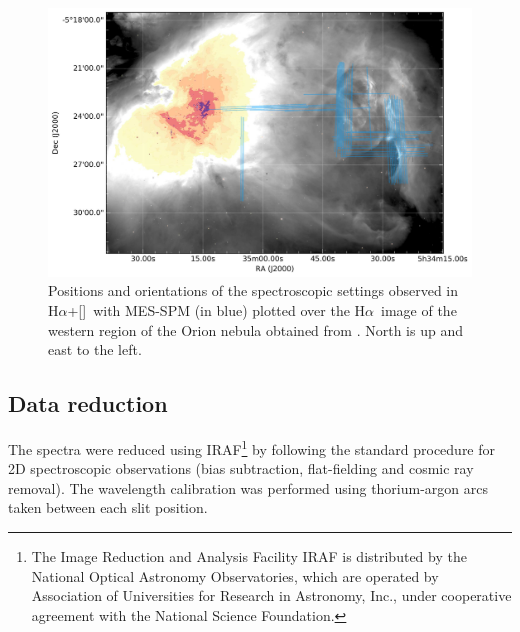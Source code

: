 \documentclass[a4paper,fleqn,usenatbib]{mnras}     %
\newcommand{\Ha} {H$\alpha$}      		%
\newcommand{\NII} {[\ion{N}{ii}]}            %
\begin{document}
\begin{figure}
	    \includegraphics[width=\textwidth]{Figs/fov_with_slits.pdf}
	    \caption{Positions and orientations of the spectroscopic settings observed in \Ha+\NII~with MES-SPM (in blue) plotted over 
                 the \Ha~image of the western region of the Orion nebula obtained from \citet{DaRio2009}. North is up and east to the left.}
    \label{fig:slits_distribution}  
\end{figure}





\subsection{Data reduction}\label{sec:reduction}
The spectra were reduced using {\small IRAF}\footnote{The Image Reduction and Analysis Facility IRAF is 
distributed by the National Optical Astronomy Observatories, which are operated by Association of Universities 
for Research in Astronomy, Inc., under cooperative agreement with the National Science Foundation.} by 
following the standard procedure for 2D spectroscopic observations (bias subtraction, flat-fielding and cosmic 
ray removal). The wavelength calibration was performed using thorium-argon arcs taken between each slit position. 
\end{document}
